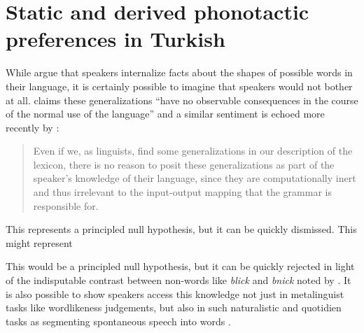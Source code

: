 \chapter{Static and derived phonotactic preferences in Turkish}

While \citet{Chomsky1965} argue that speakers internalize facts about the shapes of possible words in their language, it is certainly possible to imagine that speakers would not bother at all. \citet[][320]{Zimmer1969} claims these generalizations ``have no observable consequences in the course of the normal use of the language'' and a similar sentiment is echoed more recently by \citeauthor{PE}:

\begin{quote}
Even if we, as linguists, find some generalizations in our description of the lexicon, there is no reason to posit these generalizations as part of the speaker's knowledge of their language, since they are computationally inert and thus irrelevant to the input-output mapping that the grammar is responsible for. \citep[][18]{PE}
\end{quote}

This represents a principled null hypothesis, but it can be quickly dismissed. 
This might represent  


This would be a principled null hypothesis, but it can be quickly rejected in light of the indisputable contrast between non-words like \emph{blick} and \emph{bnick} noted by \citeauthor{Chomsky1965}. It is also possible to show speakers access this knowledge not just in metalinguist tasks like wordlikeness judgements, but also in such naturalistic and quotidien tasks as segmenting spontaneous speech into words \citep{Mattys2001b,McQueen1998}.

